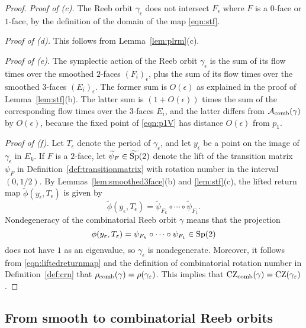 \begin{proof}
{\em Proof of (c).\/} The Reeb orbit $\gamma_\epsilon$ does not intersect $F_\epsilon$ where $F$ is a $0$-face or $1$-face, by the definition of the domain of the map \eqref{eqn:stf}.

{\em Proof of (d).\/} This follows from Lemma~\ref{lem:plrm}(c).

{\em Proof of (e).\/} The symplectic action of the Reeb orbit $\gamma_\epsilon$ is the sum of its flow times over the smoothed $2$-faces $(F_i)_\epsilon$, plus the sum of its flow times over the smoothed $3$-faces $(E_i)_\epsilon$. The former sum is $O(\epsilon)$ as explained in the proof of Lemma~\ref{lem:stf}(b). The latter sum is $(1+O(\epsilon))$ times the sum of the corresponding flow times over the $3$-faces $E_i$, and the latter differs from ${\mathcal A}_{\operatorname{comb}}(\gamma)$ by $O(\epsilon)$, because the fixed point of \eqref{eqn:p1V} has distance $O(\epsilon)$ from $p_1$.

{\em Proof of (f).\/} Let $T_\epsilon$ denote the period of $\gamma_\epsilon$, and let $y_\epsilon$ be a point on the image of $\gamma_\epsilon$ in $E_k$. If $F$ is a $2$-face, let $\widetilde{\psi}_F\in\widetilde{\operatorname{Sp}}(2)$ denote the lift of the transition matrix $\psi_F$ in Definition~\ref{def:transitionmatrix} with rotation number in the interval $(0,1/2)$. By Lemmas~\ref{lem:smoothed3face}(b) and \ref{lem:stf}(c), the lifted return map $\widetilde{\phi}(y_\epsilon,T_\epsilon)$ is given by
\begin{equation}
\label{eqn:liftedreturnmap}
\widetilde{\phi}(y_\epsilon,T_\epsilon) = \widetilde{\psi}_{F_k}\circ \cdots \circ \widetilde{\psi}_{F_1}.
\end{equation}
Nondegeneracy of the combinatorial Reeb orbit $\gamma$ means that the projection
\[
\phi(y_\varepsilon,T_\varepsilon) = \psi_{F_k}\circ \cdots \circ \psi_{F_1} \in \operatorname{Sp}(2)
\]
does not have $1$ as an eigenvalue, so $\gamma_\epsilon$ is nondegenerate. Moreover, it follows from \eqref{eqn:liftedreturnmap} and the definition of combinatorial rotation number in Definition~\ref{def:crn} that $\rho_{\operatorname{comb}}(\gamma) = \rho(\gamma_\varepsilon)$. This implies that $\operatorname{CZ}_{\operatorname{comb}}(\gamma) = \operatorname{CZ}(\gamma_\varepsilon)$.
\end{proof}

\subsection{From smooth to combinatorial Reeb orbits}
\label{sec:smoothtocomb}

